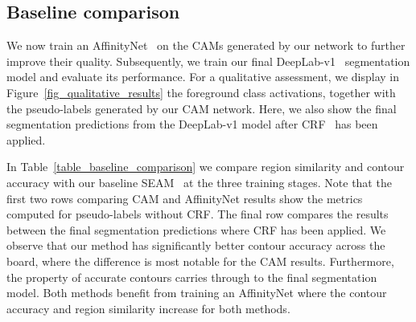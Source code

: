 \documentclass{article}
\begin{document}
\subsection{Baseline comparison}
\label{sec_baseline_comparison}

We now train an AffinityNet~\cite{ahn2018cvpr} on the CAMs generated by our network to further improve their quality. Subsequently, we train our final DeepLab-v1~\cite{chen2015iclr} segmentation model and evaluate its performance. For a qualitative assessment, we display in Figure~\ref{fig_qualitative_results} the foreground class activations, together with the pseudo-labels generated by our CAM network. Here, we also show the final segmentation predictions from the DeepLab-v1 model after CRF~\cite{krahenbuhl2011neurips} has been applied.

\iffalse
Furthermore, we use the code provided by Wang et al.~\cite{wang2020cvpr} to train an AffinityNet and DeepLab-v1 model, but with SEAM as the CAM network. To compare our results, we compute the area mIoU and contour F-score in the three stages for both methods. Table~\ref{table_baseline_comparison} shows the results on the VOC training and validation sets. Note that the first two rows comparing CAM and AffinityNet results show the metrics computed for pseudo-labels without CRF. The final row compares the results between the final segmentation predictions where CRF has been applied. We observe that our method has significantly better contour accuracy across the board, where the difference is most notable for the CAM results. Furthermore, the property of accurate contours carries through to the final segmentation predictions. Both methods benefit from training an AffinityNet where the contour accuracy and region similarity increase for both methods.
\fi

In Table~\ref{table_baseline_comparison} we compare region similarity and contour accuracy with our baseline SEAM~\cite{wang2020cvpr} at the three training stages. Note that the first two rows comparing CAM and AffinityNet results show the metrics computed for pseudo-labels without CRF. The final row compares the results between the final segmentation predictions where CRF has been applied. We observe that our method has significantly better contour accuracy across the board, where the difference is most notable for the CAM results. Furthermore, the property of accurate contours carries through to the final segmentation model. Both methods benefit from training an AffinityNet where the contour accuracy and region similarity increase for both methods.
\end{document}
